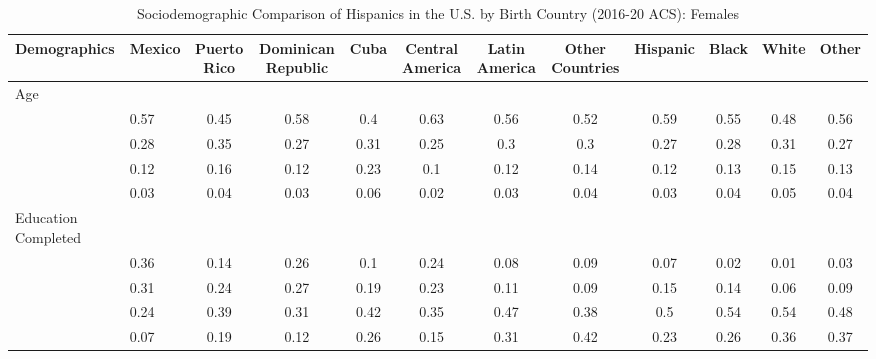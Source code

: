 \documentclass[
]{article}
\begin{document}
\begin{landscape} 


\begin{table}[ht]
\centering
\caption{Sociodemographic Comparison of Hispanics in the U.S. by Birth Country (2016-20 ACS): Females} 
\begingroup\small
\begin{tabular}{>{\raggedright\arraybackslash}p{3.2cm}|lcccccc|cccc}
  \hline
Demographics & Mexico & Puerto Rico & Dominican Republic & Cuba & Central America & Latin America & Other Countries & Hispanic & Black & White & Other \\ 
  \hline
Age &  &  &  &  &  &  &  &  &  &  &  \\ 
  \multicolumn{1}{>{\raggedleft\arraybackslash}p{1.5cm}|}{\makebox[1.5cm][r]{60 - 69 }}& 0.57 & 0.45 & 0.58 & 0.4 & 0.63 & 0.56 & 0.52 & 0.59 & 0.55 & 0.48 & 0.56 \\ 
  \multicolumn{1}{>{\raggedleft\arraybackslash}p{1.5cm}|}{\makebox[1.5cm][r]{70 - 79 }}& 0.28 & 0.35 & 0.27 & 0.31 & 0.25 & 0.3 & 0.3 & 0.27 & 0.28 & 0.31 & 0.27 \\ 
  \multicolumn{1}{>{\raggedleft\arraybackslash}p{1.5cm}|}{\makebox[1.5cm][r]{80 - 89 }}& 0.12 & 0.16 & 0.12 & 0.23 & 0.1 & 0.12 & 0.14 & 0.12 & 0.13 & 0.15 & 0.13 \\ 
  \multicolumn{1}{>{\raggedleft\arraybackslash}p{1.5cm}|}{\makebox[1.5cm][r]{90 plus }}& 0.03 & 0.04 & 0.03 & 0.06 & 0.02 & 0.03 & 0.04 & 0.03 & 0.04 & 0.05 & 0.04 \\ 
  Education Completed &  &  &  &  &  &  &  &  &  &  &  \\ 
  \multicolumn{1}{>{\raggedleft\arraybackslash}p{3.2cm}|}{\makebox[3.2cm][r]{Less than Primary }}& 0.36 & 0.14 & 0.26 & 0.1 & 0.24 & 0.08 & 0.09 & 0.07 & 0.02 & 0.01 & 0.03 \\ 
  \multicolumn{1}{>{\raggedleft\arraybackslash}p{1.7cm}|}{\makebox[1.7cm][r]{Primary }}& 0.31 & 0.24 & 0.27 & 0.19 & 0.23 & 0.11 & 0.09 & 0.15 & 0.14 & 0.06 & 0.09 \\ 
  \multicolumn{1}{>{\raggedleft\arraybackslash}p{2cm}|}{\makebox[2cm][r]{Secondary }}& 0.24 & 0.39 & 0.31 & 0.42 & 0.35 & 0.47 & 0.38 & 0.5 & 0.54 & 0.54 & 0.48 \\ 
  \multicolumn{1}{>{\raggedleft\arraybackslash}p{2cm}|}{\makebox[2cm][r]{University }}& 0.07 & 0.19 & 0.12 & 0.26 & 0.15 & 0.31 & 0.42 & 0.23 & 0.26 & 0.36 & 0.37 \\ 

\end{tabular}
\end{table}
\end{landscape}
\end{document}
